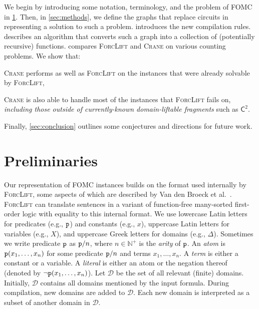 \documentclass{article}
\newcommand{\Ctwo}{$\mathsf{C}^{2}$}
\newcommand{\predicate}{\texttt{\textup{p}}}
\begin{document}

We begin by introducing some notation, terminology, and the problem of FOMC in
\cref{sec:recprelims}. Then, in \cref{sec:methods}, we define the graphs that
replace circuits in representing a solution to such a problem. 
introduces the new compilation rules.  describes an
algorithm that converts such a graph into a collection of (potentially
recursive) functions.  compares \textsc{ForcLift} and
\textsc{Crane} on various counting problems. We show that:
\begin{enumerate*}[label=(\roman*)]
  \item \textsc{Crane} performs as well as \textsc{ForcLift} on the instances
  that were already solvable by \textsc{ForcLift},
  \item \textsc{Crane} is also able to handle most of the instances that
  \textsc{ForcLift} fails on, \emph{including those outside of currently-known
    domain-liftable fragments} such as \Ctwo{}.
\end{enumerate*}
Finally, \cref{sec:conclusion} outlines some conjectures and directions for
future work.

\section{Preliminaries}\label{sec:recprelims}

Our representation of FOMC instances builds on the format used internally by
\textsc{ForcLift}, some aspects of which are described by Van den Broeck et
al.~. \textsc{ForcLift} can translate
sentences in a variant of function-free many-sorted first-order logic with
equality to this internal format. We use lowercase Latin letters for predicates
(e.g., $\predicate$) and constants (e.g., $x$), uppercase Latin letters for
variables (e.g., $X$), and uppercase Greek letters for domains (e.g., $\Delta$).
Sometimes we write predicate $\predicate$ as $\predicate/n$, where
$n \in \mathbb{N}^{+}$ is the \emph{arity} of $\predicate$. An \emph{atom} is
$\predicate(x_1, \dots, x_n)$ for some predicate $\predicate/n$ and terms
$x_{1}, \dots, x_{n}$. A \emph{term} is either a constant or a variable. A
\emph{literal} is either an atom or the negation thereof (denoted by
$\neg \predicate(x_1, \dots, x_n)$). Let $\mathcal{D}$ be the set of all
relevant (finite) domains. Initially, $\mathcal{D}$ contains all domains
mentioned by the input formula. During compilation, new domains are added to
$\mathcal{D}$. Each new domain is interpreted as a subset of another domain in
$\mathcal{D}$.
\end{document}
